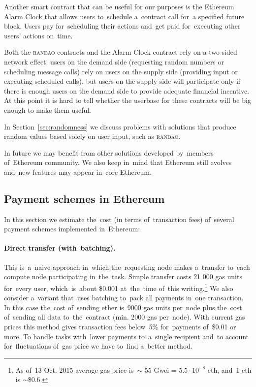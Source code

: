 \documentclass[a4paper]{article}
\begin{document}
    Another smart contract that can be useful for our purposes is the Ethereum Alarm Clock \cite{ALARM}
    that allows users to~schedule a~contract call for~a specified future block.
    Users pay for~scheduling their actions and~get paid for~executing other users' actions on~time.

    Both the \textsc{randao} contracts and the Alarm Clock contract rely on a two-sided network effect:
    users on the demand side (requesting random numbers or scheduling message calls) rely on users on the supply side
    (providing input or executing scheduled calls), but users on the supply side will participate only if there is
    enough users on the demand side to provide adequate financial incentive. At this point it is hard to tell whether 
    the userbase for these contracts will be big enough to make them useful.

    In Section~\ref{sec:randomness} we discuss problems with solutions that produce random values based solely on user input,
    such as \textsc{randao}.
    
    In future we may benefit from other solutions developed by~members of~Ethereum community. We also keep in~mind that
    Ethereum still evolves and~new features may appear in~core Ethereum.

\subsection{Payment schemes in Ethereum}

    In this section we estimate the~cost (in terms of~transaction fees) of~several payment schemes implemented in~Ethereum:

    \paragraph{Direct transfer (with~batching).}
    This is~a~naive approach in~which the~requesting node makes a~transfer to~each compute node participating in~the~task.
    Simple transfer costs 21 000 gas units for~every user, which~is~about \$0.001 at~the~time of~this writing.\footnote{%
      As of~13 Oct. 2015 average gas price is~$\sim$ 55 Gwei = $5.5 \cdot 10^{-8}$ eth, and~1 eth is $\sim$\$0.6.}
    We also consider a~variant that~uses batching\cite{BUTERIN} to~pack all payments in~one transaction.
    In this case the~cost of~sending ether is~9000 gas units per~node plus the~cost of~sending all data
    to~the~contract (min. 2000 gas per~node). With current gas prices this method gives transaction fees
    below~5\% for~payments of~\$0.01 or more. To handle tasks with~lower payments to~a~single recipient and~to
    account for~fluctuations of~gas price we have to~find a~better method.
\end{document}
